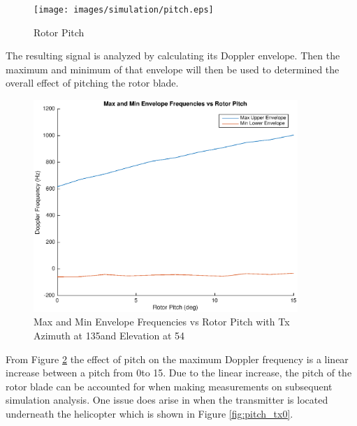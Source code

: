 \begin{figure}
	\begin{center}
		\texttt{[image: images/simulation/pitch.eps]}
		\caption{Rotor Pitch}
		\label{fig:blade_pitch}
	\end{center}
\end{figure}

The resulting signal is analyzed by calculating its Doppler envelope. Then the maximum and minimum of that envelope will then be used to determined the overall effect of pitching the rotor blade. 

\begin{figure}
	\begin{center}
		\includegraphics[width=10cm]{images/simulation/pitch_max_doppler.eps}
		\caption{Max and Min Envelope Frequencies vs Rotor Pitch with Tx Azimuth at 135\textdegree \space and Elevation at 54\textdegree}
		\label{fig:pitch_15_135deg}
	\end{center}
\end{figure}

From Figure \ref{fig:pitch_15_135deg} the effect of pitch on the maximum Doppler frequency is a linear increase between a pitch from 0\textdegree \space to 15\textdegree. Due to the linear increase, the pitch of the rotor blade can be accounted for when making measurements on subsequent simulation analysis. One issue does arise in when the transmitter is located underneath the helicopter which is shown in Figure \ref{fig:pitch_tx0}.

